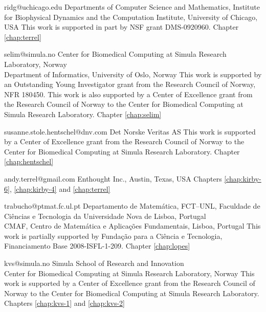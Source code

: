              {ridg@uchicago.edu}
             {Departments of Computer Science and Mathematics,
              Institute for Biophysical Dynamics and the Computation Institute,
              University of Chicago, USA}
             {This work is supported in part by NSF grant DMS-0920960.}
             {Chapter \ref{chap:terrel}}

             {selim@simula.no}
             {Center for Biomedical Computing at Simula Research Laboratory, Norway \\
              Department of Informatics, University of Oslo, Norway}
             {This work is supported by an Outstanding Young
              Investigator grant from the Research Council of Norway,
              NFR 180450. This work is also supported by a Center of
              Excellence grant from the Research Council of Norway to
              the Center for Biomedical Computing at Simula Research
              Laboratory.}
             {Chapter \ref{chap:selim}}

             {susanne.stole.hentschel@dnv.com}
             {Det Norske Veritas AS}
             {This work is supported by a Center of Excellence
              grant from the Research Council of Norway to the Center
              for Biomedical Computing at Simula Research
              Laboratory.}
             {Chapter \ref{chap:hentschel}}

             {andy.terrel@gmail.com}
             {Enthought Inc., Austin, Texas, USA}
             {}
             {Chapters
              \ref{chap:kirby-6},
              \ref{chap:kirby-4} and
              \ref{chap:terrel}}

             {trabucho@ptmat.fc.ul.pt}
             {Departamento de Matem\'{a}tica, FCT--UNL,
              Faculdade de Ci\^{e}ncias e Tecnologia da Universidade Nova de Lisboa, Portugal \\
              CMAF, Centro de Matem\'{a}tica e Aplica\c{c}\~{o}es Fundamentais, Lisboa, Portugal}
             {This work is partially supported by Funda\c{c}\~{a}o para a Ci\^{e}ncia e Tecnologia, Financiamento Base 2008-ISFL-1-209.}
             {Chapter \ref{chap:lopes}}

             {kvs@simula.no}
             {Simula School of Research and Innovation \\
              Center for Biomedical Computing at Simula Research Laboratory, Norway}
             {This work is supported by a Center of Excellence grant
              from the Research Council of Norway to the Center for
              Biomedical Computing at Simula Research Laboratory.}
             {Chapters \ref{chap:kvs-1} and \ref{chap:kvs-2}}

